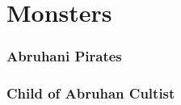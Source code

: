 
\section{Monsters}


\begin{multicols*}{2}

\subsubsection*{Abruhani Pirates}

\subsubsection*{Child of Abruhan Cultist}







\end{multicols*}
